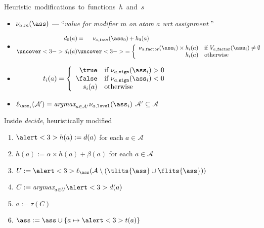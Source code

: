 \begin{frame}{Heuristic~modifications~to~functions~$h$~and~$s$}
  \medskip
  \begin{itemize}
  \item<2-> $\nu_{a,m}(\ass)$ --- ``{\em value for modifier $m$ on atom $a$ wrt assignment \ass}''
    \medskip
  \item<3-> 
    \begin{align*}
      d_0(a)&=\quad\;\nu_{a,\mathtt{init}}(\ass_0)+h_0(a)
      \\
      \uncover<3->{d_i(a)}&\uncover<3->{=
        \left\{
          \begin{array}{rl}
            \nu_{a,\mathtt{factor}}(\ass_i)\times h_i(a)&\text{if } V_{a,\mathtt{factor}}(\ass_i)\neq\emptyset
            \\
            h_i(a)&\text{otherwise}
          \end{array}
        \right.}
    \end{align*}
  \item<3-> 
    \begin{align*}
      t_i(a)&=
      \left\{
        \begin{array}{rl}
          \true &\text{if }
          \nu_{a,\mathtt{sign}}(\ass_i)>0
          \\
          \false&\text{if }
          \nu_{a,\mathtt{sign}}(\ass_i)<0
          \\
          s_i(a)&\text{otherwise}
        \end{array}
      \right.\qquad\qquad\qquad\quad\;
    \end{align*}
  \item<3->  \quad
    \(
    \ell_{\ass_i}(\mathcal{A}')=\textit{argmax}_{a\in\mathcal{A}'}\nu_{a,\mathtt{level}}(\ass_i)
    \)
    \qquad
    $\mathcal{A}'\subseteq\mathcal{A}$
  \end{itemize}
\end{frame}
\begin{frame}[c]{Inside \alert<1>{\textit{decide}}, {heuristically modified}}
  \pause
  \begin{enumerate}\addtocounter{enumi}{-1}
  \item $\alert<3>{h(a) := d(a)}$                         \hfill for each $a\in\mathcal{A}\qquad$
  \item $h(a) := \alpha\times h(a) + \beta(a)$ \hfill for each $a\in\mathcal{A}\qquad$
  \item $U:=\alert<3>{\ell_{\ass}}(\mathcal{A}\setminus (\tlits{\ass}\cup\flits{\ass}))$
  \item $C:= \textit{argmax}_{a\in U}\alert<3>{d}(a)$
  \item $a:= \tau(C)$
  \item $\ass := \ass\cup\{a\mapsto\alert<3>{t}(a)\}$
  \end{enumerate}
\end{frame}

